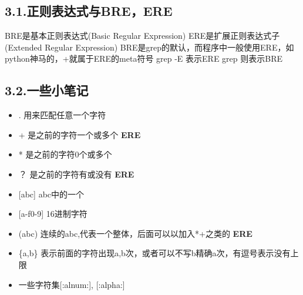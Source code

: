 \documentclass{article}
\begin{document}
\subsection{3.1.\hspace*{0.5em}正则表达式与BRE，ERE}\label{sec-breere}%

\noindent{}BRE是基本正则表达式(Basic Regular Expression)\mdbr
{}ERE是扩展正则表达式子(Extended Regular Expression)\mdbr
{}BRE是grep的默认，而程序中一般使用ERE，如python神马的，+就属于ERE的meta符号\mdbr
{}grep -E 表示ERE\mdbr
{}grep 则表示BRE %

\subsection{3.2.\hspace*{0.5em}一些小笔记}\label{section}%

\begin{itemize}[noitemsep,topsep=\mdcompacttopsep]%

\item{}. 用来匹配任意一个字符%

\item{}+ 是之前的字符一个或多个 \textbf{ERE}%

\item{}* 是之前的字符0个或多个%

\item{}？ 是之前的字符有或没有 \textbf{ERE}%

\item{}[abc] abc中的一个%

\item{}[a-f0-9] 16进制字符%

\item{}(abc) 连续的abc,代表一个整体，后面可以以加入*+之类的 \textbf{ERE}%

\item{}\{a,b\} 表示前面的字符出现a,b次，或者可以不写b精确a次，有逗号表示没有上限%

\item{}一些字符集[:alnum:], [:alpha:]%
\end{itemize}%
\end{document}
